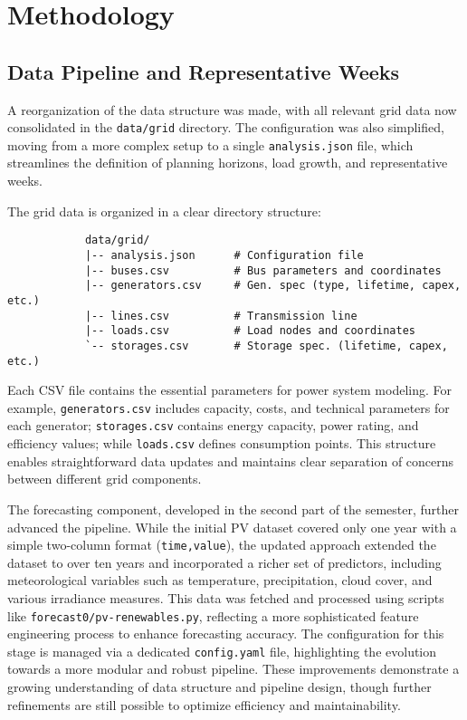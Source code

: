 \newpage
\section{Methodology}

\subsection{Data Pipeline and Representative Weeks}

A reorganization of the data structure was made, with all relevant grid data now consolidated in 
the \texttt{data/grid} directory. The configuration was also simplified, moving from a more complex 
setup to a single \texttt{analysis.json} file, which streamlines the definition of planning horizons, 
load growth, and representative weeks. 

The grid data is organized in a clear directory structure:

\begin{verbatim}
            data/grid/
            |-- analysis.json      # Configuration file
            |-- buses.csv          # Bus parameters and coordinates
            |-- generators.csv     # Gen. spec (type, lifetime, capex, etc.)
            |-- lines.csv          # Transmission line
            |-- loads.csv          # Load nodes and coordinates  
            `-- storages.csv       # Storage spec. (lifetime, capex, etc.)

\end{verbatim}

Each CSV file contains the essential parameters for power system modeling. For example, 
\texttt{generators.csv} includes capacity, costs, and technical parameters for each generator; 
\texttt{storages.csv} contains energy capacity, power rating, and efficiency values; while 
\texttt{loads.csv} defines consumption points. This structure enables straightforward data 
updates and maintains clear separation of concerns between different grid components.


The forecasting component, developed in the second part of the semester, further advanced the 
pipeline. While the initial PV dataset covered only one year with a simple two-column format 
(\texttt{time,value}), the updated approach extended the dataset to over ten years and incorporated 
a richer set of predictors, including meteorological variables such as temperature, precipitation, 
cloud cover, and various irradiance measures. This data was fetched and processed using scripts like
\texttt{forecast0/pv-renewables.py}, reflecting a more sophisticated feature engineering process 
to enhance forecasting accuracy. The configuration for this stage is managed via a dedicated 
\texttt{config.yaml} file, highlighting the evolution towards a more modular and robust pipeline. 
These improvements demonstrate a growing understanding of data structure and pipeline design, 
though further refinements are still possible to optimize efficiency and maintainability.

